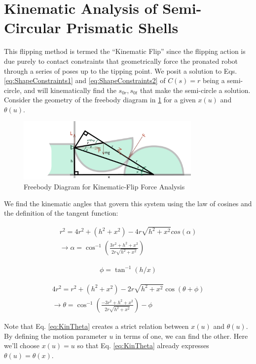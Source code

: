 \documentclass[letterpaper]{report}
\begin{document}
\section{Kinematic Analysis of Semi-Circular Prismatic Shells}
This flipping method is termed the ``Kinematic Flip'' since the flipping action is due purely to contact constraints that geometrically force the pronated robot through a series of poses up to the tipping point.
We posit a solution to Eqs. \ref{eq:ShapeConstraints1} and \ref{eq:ShapeConstraints2} of $C(s) = r$ being a semi-circle, and will kinematically find the $s_{0r}, s_{0t}$ that make the semi-circle a solution.
Consider the geometry of the freebody diagram in \ref{fig:KinFreebody} for a given $x(u)$ and $\theta(u)$.

\begin{figure}[ht]
\centering
\includegraphics[width=0.8\textwidth]{Kin_FreeBodyDiagram.png}
\caption{\label{fig:KinFreebody}Freebody Diagram for Kinematic-Flip Force Analysis}
\end{figure}

We find the kinematic angles that govern this system using the law of cosines and the definition of the tangent function:

\begin{align}
  r^2 = 4 r^2 + (h^2 + x^2) - 4r \sqrt{h^2 + x^2} cos(\alpha) \\
  \rightarrow \alpha = \cos^{-1} \left( \frac{3r^2 + h^2 + x^2}{2r \sqrt{h^2 + x^2}} \right)
\end{align}

\begin{align}
  \phi = \tan^{-1}(h/x)
\end{align}

\begin{align}
  4 r^2 = r^2 + (h^2 + x^2) - 2r \sqrt{h^2 + x^2} \cos(\theta + \phi) \\
  \rightarrow \theta = \cos^{-1} \left( \frac{-3r^2 + h^2 + x^2}{2r \sqrt{h^2 + x^2}} \right) - \phi \label{eq:KinTheta}
\end{align}

Note that Eq. \ref{eq:KinTheta} creates a strict relation between $x(u)$ and $\theta(u)$.
By defining the motion parameter $u$ in terms of one, we can find the other.
Here we'll choose $x(u) = u$ so that Eq. \ref{eq:KinTheta} already expresses $\theta(u) = \theta(x)$.
\end{document}

